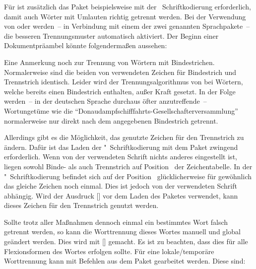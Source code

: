 Für  ist zusätzlich das Paket  beispielsweise 
mit der ~Schriftkodierung erforderlich, damit auch Wörter mit 
Umlauten richtig getrennt werden. Bei der Verwendung von  
oder  werden~-- in Verbindung mit einem der zwei genannten 
Sprachpakete~-- die besseren Trennungsmuster automatisch aktiviert. Der Beginn 
einer Dokumentpräambel könnte folgendermaßen aussehen:
%
\begin{quoting}[rightmargin=0pt]
\end{quoting}
%
Eine Anmerkung noch zur Trennung von Wörtern mit Bindestrichen. Normalerweise 
sind die beiden von  verwendeten Zeichen für Bindestrich und 
Trennstrich identisch. Leider wird der Trennungsalgorithmus von  
bei Wörtern, welche bereits einen Bindestrich enthalten, außer Kraft gesetzt. 
In der Folge werden~-- in der deutschen Sprache durchaus öfter anzutreffende~-- 
Wortungetüme wie die \enquote{Donaudampfschifffahrts-Gesellschafterversammlung} 
normalerweise nur direkt nach dem angegebenen Bindestrich getrennt. 

Allerdings gibt es die Möglichkeit, das genutzte Zeichen für den Trennstrich 
zu ändern. Dafür ist das Laden der "~Schriftkodierung mit dem Paket 
 zwingend erforderlich. Wenn von der verwendeten Schrift 
nichts anderes eingestellt ist, liegen sowohl Binde- als auch Trennstrich auf 
Position~ der Zeichentabelle. In der "~Schriftkodierung 
befindet sich auf der Position~ glücklicherweise für gewöhnlich das 
gleiche Zeichen noch einmal. Dies ist jedoch von der verwendeten Schrift 
abhängig. Wird der Ausdruck [] vor dem 
Laden des Paketes  verwendet, kann dieses Zeichen für den 
Trennstrich genutzt werden. 

Sollte trotz aller Maßnahmen dennoch einmal ein bestimmtes Wort falsch getrennt 
werden, so kann die Worttrennung dieses Wortes manuell und global geändert 
werden. Dies wird mit [] 
gemacht. Es ist zu beachten, dass dies für alle Flexionsformen des Wortes 
erfolgen sollte. Für eine lokale/temporäre Worttrennung kann mit Befehlen aus 
dem Paket  gearbeitet werden. Diese sind: 

